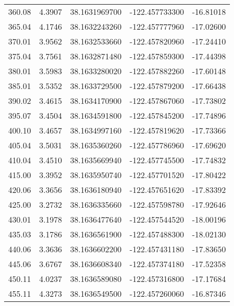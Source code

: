 \begin{longtable}{p{2.5cm}p{2.5cm}p{3cm}p{3cm}p{2.5cm}}
       360.08  & 	 4.3907 &               38.1631969700  &   -122.457733300   &	-16.81018 \\
       365.04  & 	 4.1746 &               38.1632243260  &   -122.457777960   &	-17.02600 \\
       370.01  & 	 3.9562 &               38.1632533660  &   -122.457820960   &	-17.24410 \\
       375.04  & 	 3.7561 &               38.1632871480  &   -122.457859300   &	-17.44398 \\
       380.01  & 	 3.5983 &               38.1633280020  &   -122.457882260   &	-17.60148 \\
       385.01  & 	 3.5352 &               38.1633729500  &   -122.457879200   &	-17.66438 \\
       390.02  & 	 3.4615 &               38.1634170900  &   -122.457867060   &	-17.73802 \\
       395.07  & 	 3.4504 &               38.1634591800  &   -122.457845200   &	-17.74896 \\
       400.10  & 	 3.4657 &               38.1634997160  &   -122.457819620   &	-17.73366 \\
       405.04  & 	 3.5031 &               38.1635360260  &   -122.457786960   &	-17.69620 \\
       410.04  & 	 3.4510 &               38.1635669940  &   -122.457745500   &	-17.74832 \\
       415.00  & 	 3.3952 &               38.1635950740  &   -122.457701520   &	-17.80422 \\
       420.06  & 	 3.3656 &               38.1636180940  &   -122.457651620   &	-17.83392 \\
       425.00  & 	 3.2732 &               38.1636335660  &   -122.457598780   &	-17.92646 \\
       430.01  & 	 3.1978 &               38.1636477640  &   -122.457544520   &	-18.00196 \\
       435.03  & 	 3.1786 &               38.1636561900  &   -122.457488300   &	-18.02130 \\
       440.06  & 	 3.3636 &               38.1636602200  &   -122.457431180   &	-17.83650 \\
       445.06  & 	 3.6767 &               38.1636608340  &   -122.457374180   &	-17.52358 \\
       450.11  & 	 4.0237 &               38.1636589080  &   -122.457316800   &	-17.17684 \\
       455.11  & 	 4.3273 &               38.1636549500  &   -122.457260060   &	-16.87346 \\

\end{longtable}
